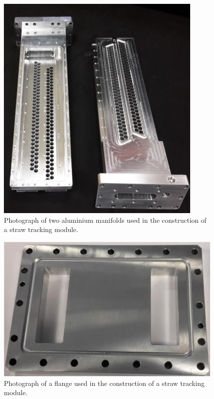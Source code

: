 \begin{figure}[th]
\centering
\includegraphics[scale=0.8]{Figures/manifold.png}
\decoRule
\caption{Photograph of two aluminium manifolds used in the construction of a straw tracking module.}
\label{fig:manifold}
\end{figure}

\begin{figure}[th]
\centering
\includegraphics[scale=0.7]{Figures/flange.png}
\decoRule
\caption{Photograph of a flange used in the construction of a straw tracking module.}
\label{fig:flange}
\end{figure}

